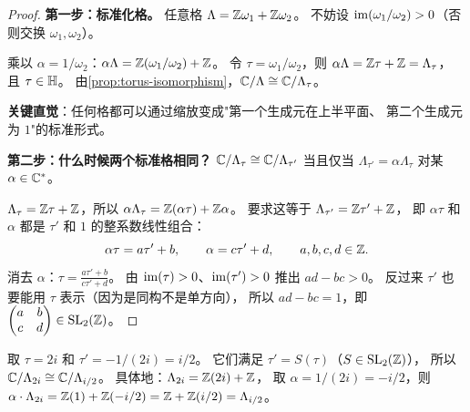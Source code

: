 \begin{proof}
\textbf{第一步：标准化格。}
任意格 $\Lambda = \mathbb{Z}\omega_1 + \mathbb{Z}\omega_2$。
不妨设 $\operatorname{im}(\omega_1/\omega_2) > 0$（否则交换 $\omega_1, \omega_2$）。

乘以 $\alpha = 1/\omega_2$：$\alpha\Lambda = \mathbb{Z}(\omega_1/\omega_2) + \mathbb{Z}$。
令 $\tau = \omega_1/\omega_2$，则 $\alpha\Lambda = \mathbb{Z}\tau + \mathbb{Z} = \Lambda_\tau$，
且 $\tau \in \mathbb{H}$。
由\cref{prop:torus-isomorphism}，$\mathbb{C}/\Lambda \cong \mathbb{C}/\Lambda_\tau$。

\textbf{关键直觉}：任何格都可以通过缩放变成"第一个生成元在上半平面、
第二个生成元为 $1$"的标准形式。

\textbf{第二步：什么时候两个标准格相同？}
$\mathbb{C}/\Lambda_\tau \cong \mathbb{C}/\Lambda_{\tau'}$ 当且仅当
$\Lambda_{\tau'} = \alpha\Lambda_\tau$ 对某 $\alpha \in \mathbb{C}^*$。

$\Lambda_\tau = \mathbb{Z}\tau + \mathbb{Z}$，所以 $\alpha\Lambda_\tau = \mathbb{Z}(\alpha\tau) + \mathbb{Z}\alpha$。
要求这等于 $\Lambda_{\tau'} = \mathbb{Z}\tau' + \mathbb{Z}$，
即 $\alpha\tau$ 和 $\alpha$ 都是 $\tau'$ 和 $1$ 的整系数线性组合：
\[
  \alpha\tau = a\tau' + b, \qquad \alpha = c\tau' + d,
  \qquad a,b,c,d \in \mathbb{Z}.
\]
消去 $\alpha$：$\tau = \frac{a\tau' + b}{c\tau' + d}$。
由 $\operatorname{im}(\tau) > 0$、$\operatorname{im}(\tau') > 0$ 推出 $ad - bc > 0$。
反过来 $\tau'$ 也要能用 $\tau$ 表示（因为是同构不是单方向），
所以 $ad - bc = 1$，即 $\begin{pmatrix} a & b \\ c & d \end{pmatrix} \in \mathrm{SL}_2(\mathbb{Z})$。
\end{proof}

\begin{example}[同一个环面的不同参数]
\label{ex:equivalent-tau}
取 $\tau = 2i$ 和 $\tau' = -1/(2i) = i/2$。
它们满足 $\tau' = S(\tau)$（$S \in \mathrm{SL}_2(\mathbb{Z})$），
所以 $\mathbb{C}/\Lambda_{2i} \cong \mathbb{C}/\Lambda_{i/2}$。
具体地：$\Lambda_{2i} = \mathbb{Z}(2i) + \mathbb{Z}$，
取 $\alpha = 1/(2i) = -i/2$，则
$\alpha \cdot \Lambda_{2i} = \mathbb{Z}(1) + \mathbb{Z}(-i/2) = \mathbb{Z} + \mathbb{Z}(i/2) = \Lambda_{i/2}$。
\end{example}


